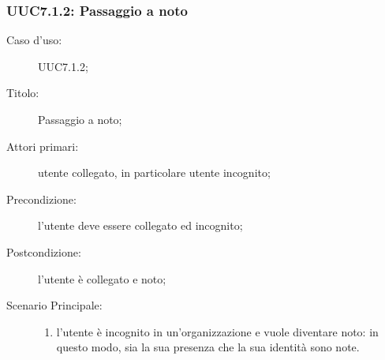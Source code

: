 \documentclass[../../../analisi-dei-requisiti.tex]{subfiles}
\begin{document}
\subsubsection{UUC7.1.2: Passaggio a noto}%
\label{subs:UUC7.1.2}
\begin{description}
  \item[Caso d’uso:] UUC7.1.2;
  \item[Titolo:] Passaggio a noto;
  \item[Attori primari:] utente collegato, in particolare utente incognito;
  \item[Precondizione:] l'utente deve essere collegato ed incognito;
  \item[Postcondizione:] l'utente è collegato e noto;
  \item[Scenario Principale:]
        \begin{enumerate}
          \item l'utente è incognito in un'organizzazione e vuole diventare noto: in questo modo, sia la sua presenza che la sua identità sono note.
        \end{enumerate}
\end{description}
\end{document}

